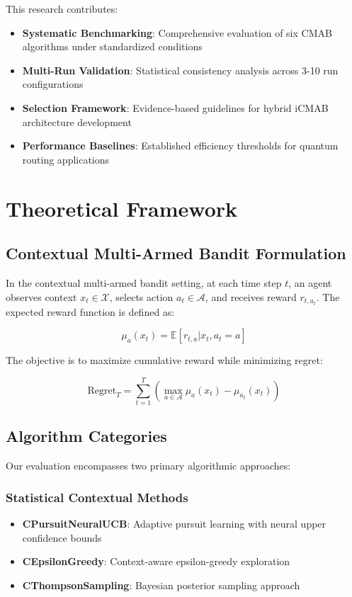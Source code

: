 \documentclass[12pt,a4paper]{article}
\begin{document}
This research contributes:

\begin{itemize}
\item \textbf{Systematic Benchmarking}: Comprehensive evaluation of six CMAB algorithms under standardized conditions
\item \textbf{Multi-Run Validation}: Statistical consistency analysis across 3-10 run configurations
\item \textbf{Selection Framework}: Evidence-based guidelines for hybrid iCMAB architecture development
\item \textbf{Performance Baselines}: Established efficiency thresholds for quantum routing applications
\end{itemize}

\section{Theoretical Framework}

\subsection{Contextual Multi-Armed Bandit Formulation}

In the contextual multi-armed bandit setting, at each time step $t$, an agent observes context $x_t \in \mathcal{X}$, selects action $a_t \in \mathcal{A}$, and receives reward $r_{t,a_t}$. The expected reward function is defined as:

\begin{equation}
\mu_a(x_t) = \mathbb{E}[r_{t,a} | x_t, a_t = a]
\end{equation}

The objective is to maximize cumulative reward while minimizing regret:

\begin{equation}
\text{Regret}_T = \sum_{t=1}^{T} \left(\max_{a \in \mathcal{A}} \mu_a(x_t) - \mu_{a_t}(x_t)\right)
\end{equation}

\subsection{Algorithm Categories}

Our evaluation encompasses two primary algorithmic approaches:

\subsubsection{Statistical Contextual Methods}
\begin{itemize}
\item \textbf{CPursuitNeuralUCB}: Adaptive pursuit learning with neural upper confidence bounds
\item \textbf{CEpsilonGreedy}: Context-aware epsilon-greedy exploration
\item \textbf{CThompsonSampling}: Bayesian posterior sampling approach
\end{itemize}
\end{document}
